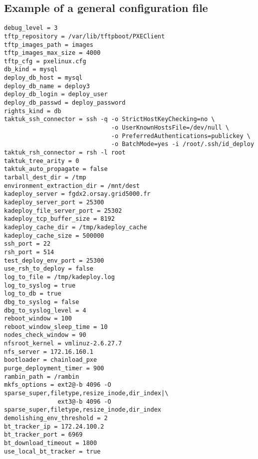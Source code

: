 \documentclass[a4wide,10pt,oneside]{book}
\begin{document}
\subsection{Example of a general configuration file}
\begin{small}
\begin{verbatim}
debug_level = 3
tftp_repository = /var/lib/tftpboot/PXEClient
tftp_images_path = images
tftp_images_max_size = 4000
tftp_cfg = pxelinux.cfg
db_kind = mysql
deploy_db_host = mysql
deploy_db_name = deploy3
deploy_db_login = deploy_user
deploy_db_passwd = deploy_password
rights_kind = db
taktuk_ssh_connector = ssh -q -o StrictHostKeyChecking=no \
                              -o UserKnownHostsFile=/dev/null \
                              -o PreferredAuthentications=publickey \
                              -o BatchMode=yes -i /root/.ssh/id_deploy
taktuk_rsh_connector = rsh -l root
taktuk_tree_arity = 0
taktuk_auto_propagate = false
tarball_dest_dir = /tmp
environment_extraction_dir = /mnt/dest
kadeploy_server = fgdx2.orsay.grid5000.fr
kadeploy_server_port = 25300
kadeploy_file_server_port = 25302
kadeploy_tcp_buffer_size = 8192
kadeploy_cache_dir = /tmp/kadeploy_cache
kadeploy_cache_size = 500000
ssh_port = 22
rsh_port = 514
test_deploy_env_port = 25300
use_rsh_to_deploy = false
log_to_file = /tmp/kadeploy.log
log_to_syslog = true
log_to_db = true
dbg_to_syslog = false
dbg_to_syslog_level = 4
reboot_window = 100
reboot_window_sleep_time = 10
nodes_check_window = 90
nfsroot_kernel = vmlinuz-2.6.27.7
nfs_server = 172.16.160.1
bootloader = chainload_pxe
purge_deployment_timer = 900
rambin_path = /rambin
mkfs_options = ext2@-b 4096 -O sparse_super,filetype,resize_inode,dir_index|\
               ext3@-b 4096 -O sparse_super,filetype,resize_inode,dir_index
demolishing_env_threshold = 2
bt_tracker_ip = 172.24.100.2
bt_tracker_port = 6969
bt_download_timeout = 1800
use_local_bt_tracker = true
\end{verbatim}
\end{small}
\end{document}

